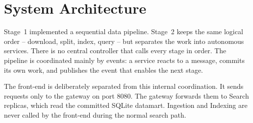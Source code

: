 \documentclass[12pt,a4paper]{article}
\begin{document}
\section{System Architecture}
\label{sec:architecture}
Stage~1 implemented a sequential data pipeline. Stage~2 keeps the same logical order -- download,
split, index, query -- but separates the work into autonomous services. There is no central
controller that calls every stage in order. The pipeline is coordinated mainly by events: a service
reacts to a message, commits its own work, and publishes the event that enables the next stage.

The front-end is deliberately separated from this internal coordination. It sends requests only to
the gateway on port 8080. The gateway forwards them to Search replicas, which read the committed
SQLite datamart. Ingestion and Indexing are never called by the front-end during the normal search
path.
\end{document}
